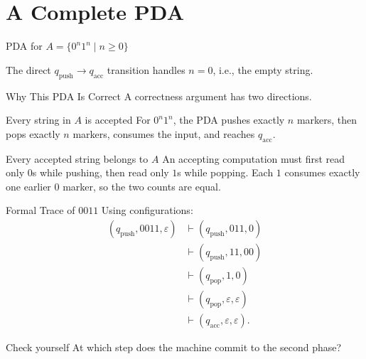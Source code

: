 \documentclass[aspectratio=169,10pt]{beamer}
\newcommand{\eps}{\varepsilon}
\newcommand{\turn}{\vdash}
\begin{document}
\section{A Complete PDA}

\begin{frame}{PDA for $A=\{0^n1^n\mid n\ge 0\}$}
\centering
{}

\vspace{1em}
The direct $q_{\mathrm{push}}\to q_{\mathrm{acc}}$ transition handles $n=0$, i.e., the empty string.
\end{frame}

\begin{frame}{Why This PDA Is Correct}
A correctness argument has two directions.

\begin{block}{Every string in $A$ is accepted}
For $0^n1^n$, the PDA pushes exactly $n$ markers, then pops exactly $n$ markers, consumes the input, and reaches $q_{\mathrm{acc}}$.
\end{block}

\begin{alertblock}{Every accepted string belongs to $A$}
An accepting computation must first read only $0$s while pushing, then read only $1$s while popping. Each $1$ consumes exactly one earlier $0$ marker, so the two counts are equal.
\end{alertblock}
\end{frame}

\begin{frame}{Formal Trace of $0011$}
Using configurations:
\begin{align*}
(q_{\mathrm{push}},0011,\eps)
&\turn(q_{\mathrm{push}},011,0)\\
&\turn(q_{\mathrm{push}},11,00)\\
&\turn(q_{\mathrm{pop}},1,0)\\
&\turn(q_{\mathrm{pop}},\eps,\eps)\\
&\turn(q_{\mathrm{acc}},\eps,\eps).
\end{align*}

\vspace{0.6em}
\begin{exampleblock}{Check yourself}
At which step does the machine commit to the second phase?
\end{exampleblock}
\end{frame}
\end{document}
